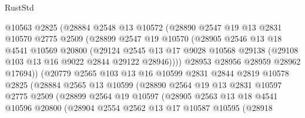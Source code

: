 \begin{lexlean}{RustStd}
\begin{coremodule}
                    @10563
                    @2825
                    (@28884
                      @2548
                      @13
                      @10572
                      (@28890
                        @2547
                        @19
                        @13
                        @2831
                        @10570
                        @2775
                        @2509
                        (@28899
                          @2547
                          @19
                          @10570
                          (@28905
                            @2546
                            @13
                            @18
                            @4541
                            @10569
                            @20800
                            (@29124
                              @2545
                              @13
                              @17
                              @9028
                              @10568
                              @29138
                              (@29108 @103 @13 @16 @9022 @2844 @29122 @28946))))
                        @28953
                        @28956
                        @28959
                        @28962
                        @17694))
                    (@20779
                      @2565
                      @103
                      @13
                      @16
                      @10599
                      @2831
                      @2844
                      @2819
                      @10578
                      @2825
                      (@28884
                        @2565
                        @13
                        @10599
                        (@28890
                          @2564
                          @19
                          @13
                          @2831
                          @10597
                          @2775
                          @2509
                          (@28899
                            @2564
                            @19
                            @10597
                            (@28905
                              @2563
                              @13
                              @18
                              @4541
                              @10596
                              @20800
                              (@28904
                                @2554
                                @2562
                                @13
                                @17
                                @10587
                                @10595
                                (@28918

\end{coremodule}
\end{lexlean}
